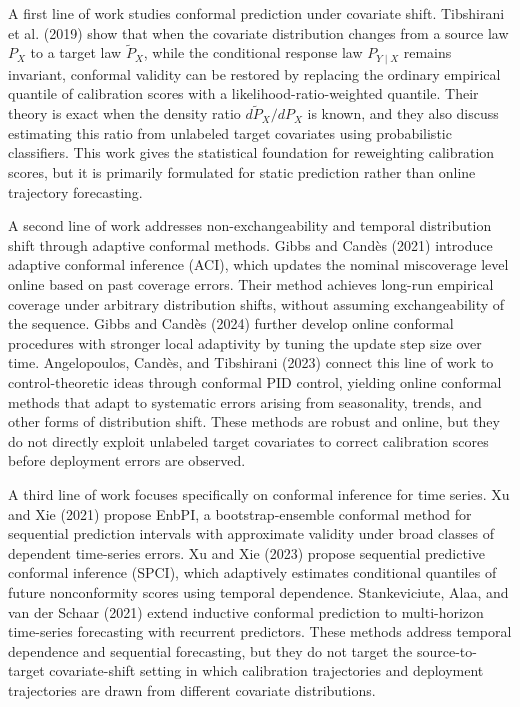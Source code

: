 \documentclass{article}
\numberwithin{equation}{section}
\begin{document}
A first line of work studies conformal prediction under covariate shift.
Tibshirani et al. (2019) show that when the covariate distribution changes from
a source law \(P_X\) to a target law \(\widetilde P_X\), while the conditional
response law \(P_{Y\mid X}\) remains invariant, conformal validity can be
restored by replacing the ordinary empirical quantile of calibration scores with
a likelihood-ratio-weighted quantile. Their theory is exact when the density
ratio \(d\widetilde P_X/dP_X\) is known, and they also discuss estimating this
ratio from unlabeled target covariates using probabilistic classifiers. This
work gives the statistical foundation for reweighting calibration scores, but it
is primarily formulated for static prediction rather than online trajectory
forecasting.

A second line of work addresses non-exchangeability and temporal distribution
shift through adaptive conformal methods. Gibbs and Candès (2021) introduce
adaptive conformal inference (ACI), which updates the nominal miscoverage level
online based on past coverage errors. Their method achieves long-run empirical
coverage under arbitrary distribution shifts, without assuming exchangeability
of the sequence. Gibbs and Candès (2024) further develop online conformal
procedures with stronger local adaptivity by tuning the update step size over
time. Angelopoulos, Candès, and Tibshirani (2023) connect this line of work to
control-theoretic ideas through conformal PID control, yielding online conformal
methods that adapt to systematic errors arising from seasonality, trends, and
other forms of distribution shift. These methods are robust and online, but they
do not directly exploit unlabeled target covariates to correct calibration
scores before deployment errors are observed.

A third line of work focuses specifically on conformal inference for time
series. Xu and Xie (2021) propose EnbPI, a bootstrap-ensemble conformal method
for sequential prediction intervals with approximate validity under broad
classes of dependent time-series errors. Xu and Xie (2023) propose sequential
predictive conformal inference (SPCI), which adaptively estimates conditional
quantiles of future nonconformity scores using temporal dependence. Stankeviciute,
Alaa, and van der Schaar (2021) extend inductive conformal prediction to
multi-horizon time-series forecasting with recurrent predictors. These methods
address temporal dependence and sequential forecasting, but they do not target
the source-to-target covariate-shift setting in which calibration trajectories
and deployment trajectories are drawn from different covariate distributions.
\end{document}
